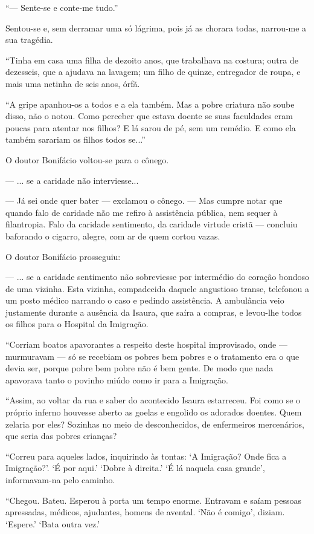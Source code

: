 ``--- Sente-se e conte-me tudo.''

Sentou-se e, sem derramar uma só lágrima, pois já as chorara todas,
narrou-me a sua tragédia.

``Tinha em casa uma filha de dezoito anos, que trabalhava na costura;
outra de dezesseis, que a ajudava na lavagem; um filho de quinze,
entregador de roupa, e mais uma netinha de seis anos, órfã.

``A gripe apanhou-os a todos e a ela também. Mas a pobre criatura não
soube disso, não o notou. Como perceber que estava doente se suas
faculdades eram poucas para atentar nos filhos? E lá sarou de pé, sem um
remédio. E como ela também sarariam os filhos todos se...''

O doutor Bonifácio voltou-se para o cônego.

--- ... se a caridade não interviesse...

--- Já sei onde quer bater --- exclamou o cônego. --- Mas cumpre notar
que quando falo de caridade não me refiro à assistência pública, nem
sequer à filantropia. Falo da caridade sentimento, da caridade virtude
cristã --- concluiu baforando o cigarro, alegre, com ar de quem cortou
vazas.

O doutor Bonifácio prosseguiu:

--- ... se a caridade sentimento não sobreviesse por intermédio do
coração bondoso de uma vizinha. Esta vizinha, compadecida daquele
angustioso transe, telefonou a um posto médico narrando o caso e pedindo
assistência. A ambulância veio justamente durante a ausência da Isaura,
que saíra a compras, e levou-lhe todos os filhos para o Hospital da
Imigração.

``Corriam boatos apavorantes a respeito deste hospital improvisado, onde
--- murmuravam --- só se recebiam os pobres bem pobres e o tratamento
era o que devia ser, porque pobre bem pobre não é bem gente. De modo que
nada apavorava tanto o povinho miúdo como ir para a Imigração.

``Assim, ao voltar da rua e saber do acontecido Isaura estarreceu. Foi
como se o próprio inferno houvesse aberto as goelas e engolido os
adorados doentes. Quem zelaria por eles? Sozinhas no meio de
desconhecidos, de enfermeiros mercenários, que seria das pobres
crianças?

``Correu para aqueles lados, inquirindo às tontas: `A Imigração? Onde
fica a Imigração?'. `É por aqui.' `Dobre à direita.' `É lá naquela casa
grande', informavam-na pelo caminho.

``Chegou. Bateu. Esperou à porta um tempo enorme. Entravam e saíam
pessoas apressadas, médicos, ajudantes, homens de avental. `Não é
comigo', diziam. `Espere.' `Bata outra vez.'

